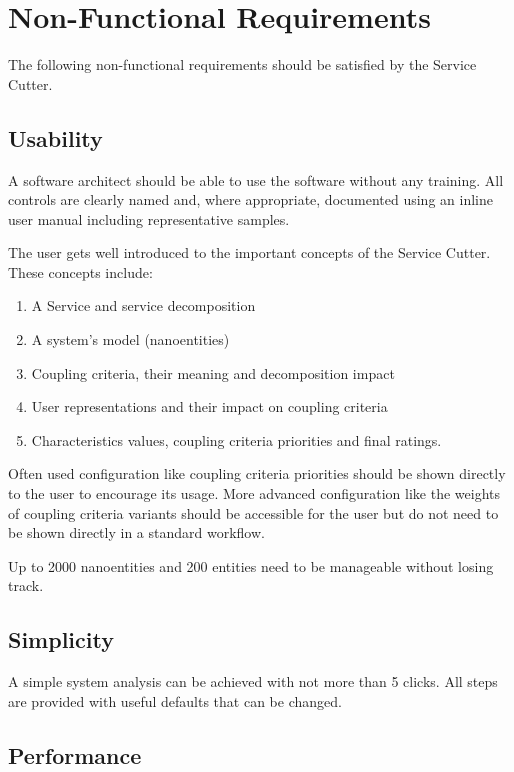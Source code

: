 \section{Non-Functional Requirements}
\label{sec:nonfunctionalRequirements}

The following non-functional requirements should be satisfied by the Service Cutter.

\subsection{Usability}
\label{sec:usability}

A software architect should be able to use the software without any training. All controls are clearly named and, where appropriate, documented using an inline user manual including representative samples.

The user gets well introduced to the important concepts of the Service Cutter. These concepts include:

\begin{enumerate}
	\item A Service and service decomposition
	\item A system's model (nanoentities)
	\item Coupling criteria, their meaning and decomposition impact
	\item User representations and their impact on coupling criteria
	\item Characteristics values, coupling criteria priorities and final ratings.
\end{enumerate}

Often used configuration like coupling criteria priorities should be shown directly to the user to encourage its usage. More advanced configuration like the weights of coupling criteria variants should be accessible for the user but do not need to be shown directly in a standard workflow. 

Up to 2000 nanoentities and 200 entities need to be manageable without losing track.

\subsection{Simplicity}

A simple system analysis can be achieved with not more than 5 clicks. All steps are provided with useful defaults that can be changed.

\subsection{Performance}


